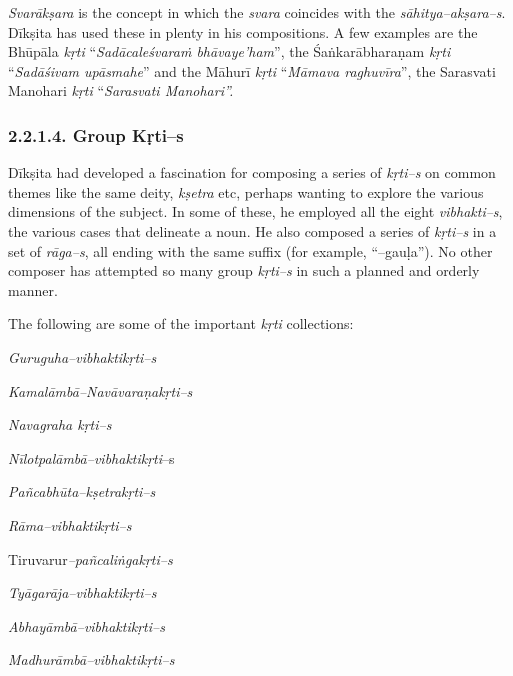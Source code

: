 \textit{Svarākṣara} is the concept in which the \textit{svara} coincides with the \textit{sāhitya–akṣara–s}. Dīkṣita has used these in plenty in his compositions. A few examples are the Bhūpāla \textit{kṛti} “\textit{Sadācaleśvaraṁ bhāvaye’ham}”, the Śaṅkarābharaṇam \textit{kṛti} “\textit{Sadāśivam upāsmahe}” and the Māhurī \textit{kṛti} “\textit{Māmava raghuvīra}”, the Sarasvati Manohari \textit{kṛti} “\textit{Sarasvati Manohari”.}


\subsubsection*{2.2.1.4. Group Kṛti–s}

Dīkṣita had developed a fascination for composing a series of \textit{kṛti–s} on common themes like the same deity, \textit{kṣetra} etc, perhaps wanting to explore the various dimensions of the subject. In some of these, he employed all the eight \textit{vibhakti–s}, the various cases that delineate a noun. He also composed a series of \textit{kṛti–s} in a set of \textit{rāga–s}, all ending with the same suffix (for example, “–gauḷa”). No other composer has attempted so many group \textit{kṛti–s} in such a planned and orderly manner.

The following are some of the important \textit{kṛti} collections:

\item \textit{Guruguha–vibhaktikṛti–s}

 \item \textit{Kamalāmbā–Navāvaraṇakṛti–s}

 \item \textit{Navagraha kṛti–s}

 \item \textit{Nīlotpalāmbā–vibhaktikṛti}–s

 \item \textit{Pañcabhūta–kṣetrakṛti–s}

 \item \textit{Rāma–vibhaktikṛti–s}

 \item Tiruvarur\textit{–pañcaliṅgakṛti–s}

 \item \textit{Tyāgarāja–vibhaktikṛti–s}

 \item \textit{Abhayāmbā–vibhaktikṛti–s}

 \item \textit{Madhurāmbā–vibhaktikṛti–s}



